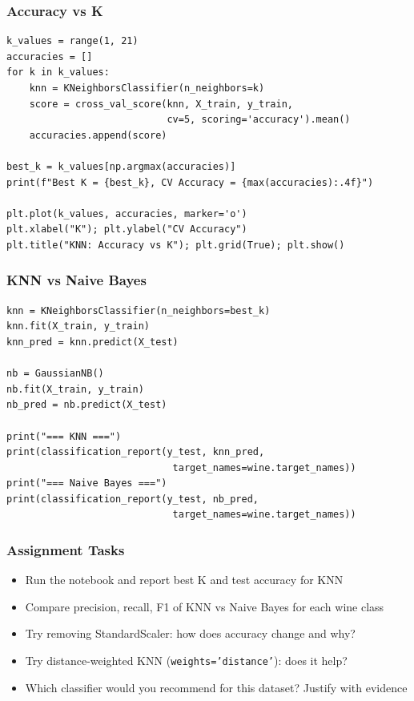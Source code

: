 \begin{frame}[fragile]\frametitle{Accuracy vs K}
\begin{lstlisting}
k_values = range(1, 21)
accuracies = []
for k in k_values:
    knn = KNeighborsClassifier(n_neighbors=k)
    score = cross_val_score(knn, X_train, y_train,
                            cv=5, scoring='accuracy').mean()
    accuracies.append(score)

best_k = k_values[np.argmax(accuracies)]
print(f"Best K = {best_k}, CV Accuracy = {max(accuracies):.4f}")

plt.plot(k_values, accuracies, marker='o')
plt.xlabel("K"); plt.ylabel("CV Accuracy")
plt.title("KNN: Accuracy vs K"); plt.grid(True); plt.show()
\end{lstlisting}
\end{frame}

\begin{frame}[fragile]\frametitle{KNN vs Naive Bayes}
\begin{lstlisting}
knn = KNeighborsClassifier(n_neighbors=best_k)
knn.fit(X_train, y_train)
knn_pred = knn.predict(X_test)

nb = GaussianNB()
nb.fit(X_train, y_train)
nb_pred = nb.predict(X_test)

print("=== KNN ===")
print(classification_report(y_test, knn_pred,
                             target_names=wine.target_names))
print("=== Naive Bayes ===")
print(classification_report(y_test, nb_pred,
                             target_names=wine.target_names))
\end{lstlisting}
\end{frame}

\begin{frame}[fragile]\frametitle{Assignment Tasks}
\begin{itemize}
\item Run the notebook and report best K and test accuracy for KNN
\item Compare precision, recall, F1 of KNN vs Naive Bayes for each wine class
\item Try removing StandardScaler: how does accuracy change and why?
\item Try distance-weighted KNN (\texttt{weights='distance'}): does it help?
\item Which classifier would you recommend for this dataset? Justify with evidence
\end{itemize}
\end{frame}
